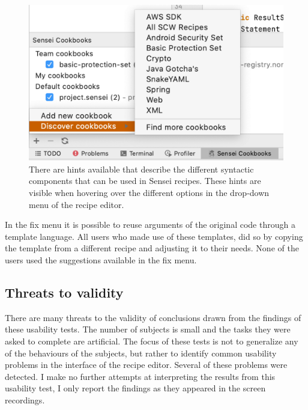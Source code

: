 \begin{figure}
  \centering
  \includegraphics[width=\textwidth,page=6]{04-tools/figures/figures1.pdf}
  \caption[Hints for different syntactic components in the recipe editor]{There are hints available that describe the different syntactic components that can be used in Sensei recipes. These hints are visible when hovering over the different options in the drop-down menu of the recipe editor.}
  \label{fig:dropdownhint} 
\end{figure}

In the fix menu it is possible to reuse arguments of the original code through a template language.
All users who made use of these templates, did so by copying the template from a different recipe and adjusting it to their needs.
None of the users used the suggestions available in the fix menu.

\subsection{Threats to validity}
There are many threats to the validity of conclusions drawn from the findings of these usability tests.
The number of subjects is small and the tasks they were asked to complete are artificial.
The focus of these tests is not to generalize any of the behaviours of the subjects, but rather to identify common usability problems in the interface of the recipe editor.
Several of these problems were detected.
I make no further attempts at interpreting the results from this usability test, I only report the findings as they appeared in the screen recordings.